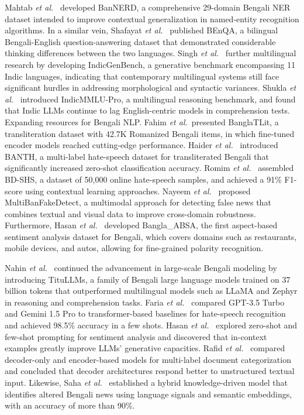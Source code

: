 \documentclass[10pt,letterpaper]{article}
\begin{document}
Mahtab \textit{et al.}~\cite{b12} developed BanNERD, a comprehensive 29-domain Bengali NER dataset intended to improve contextual generalization in named-entity recognition algorithms. In a similar vein, Shafayat \textit{et al.}~\cite{b13} published BEnQA, a bilingual Bengali-English question-answering dataset that demonstrated considerable thinking differences between the two languages. Singh \textit{et al.}~\cite{b14} further multilingual research by developing IndicGenBench, a generative benchmark encompassing 11 Indic languages, indicating that contemporary multilingual systems still face significant hurdles in addressing morphological and syntactic variances. Shukla \textit{et al.}~\cite{b15} introduced IndicMMLU-Pro, a multilingual reasoning benchmark, and found that Indic LLMs continue to lag English-centric models in comprehension tests. Expanding resources for Bengali NLP.  Fahim \textit{et al.}~\cite{b16}presented BanglaTLit, a transliteration dataset with 42.7K Romanized Bengali items, in which fine-tuned encoder models reached cutting-edge performance. Haider \textit{et al.}~\cite{b17} introduced BANTH, a multi-label hate-speech dataset for transliterated Bengali that significantly increased zero-shot classification accuracy. Romim \textit{et al.}~\cite{b18} assembled BD-SHS, a dataset of 50,000 online hate-speech samples, and achieved a 91\% F1-score using contextual learning approaches. Nayeem \textit{et al.}~\cite{b19} proposed MultiBanFakeDetect, a multimodal approach for detecting false news that combines textual and visual data to improve cross-domain robustness. Furthermore, Hasan \textit{et al.}~\cite{b20} developed Bangla\_ABSA, the first aspect-based sentiment analysis dataset for Bengali, which covers domains such as restaurants, mobile devices, and autos, allowing for fine-grained polarity recognition.

Nahin \textit{et al.}~\cite{b21} continued the advancement in large-scale Bengali modeling by introducing TituLLMs, a family of Bengali large language models trained on 37 billion tokens that outperformed multilingual models such as LLaMA and Zephyr in reasoning and comprehension tasks. Faria \textit{et al.}~\cite{b22} compared GPT-3.5 Turbo and Gemini 1.5 Pro to transformer-based baselines for hate-speech recognition and achieved 98.5\% accuracy in a few shots. Hasan \textit{et al.}~\cite{b23} explored zero-shot and few-shot prompting for sentiment analysis and discovered that in-context examples greatly improve LLMs' generative capacities. Rafid \textit{et al.}~\cite{b24} compared decoder-only and encoder-based models for multi-label document categorization and concluded that decoder architectures respond better to unstructured textual input. Likewise, Saha \textit{et al.}~\cite{b25} established a hybrid knowledge-driven model that identifies altered Bengali news using language signals and semantic embeddings, with an accuracy of more than 90\%.
\end{document}
